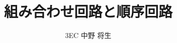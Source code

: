 \documentclass[dvipdfmx]{jsarticle}
\begin{document}
	\title{組み合わせ回路と順序回路}
	\author{3EC 中野 将生}
	\maketitle
\end{document}
